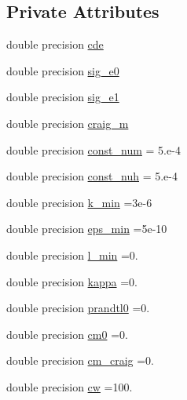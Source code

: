 \subsection*{Private Attributes}
\begin{DoxyCompactItemize}
\item 
double precision \mbox{\hyperlink{structmodulegotm_1_1t__gotmparameters_a56c279f79ac9971032ed2aae27a7fe9b}{cde}}
\item 
double precision \mbox{\hyperlink{structmodulegotm_1_1t__gotmparameters_a340e7be2fbc56cb11cd4e98757fda608}{sig\+\_\+e0}}
\item 
double precision \mbox{\hyperlink{structmodulegotm_1_1t__gotmparameters_a74ec12e25004762d70060b22a6632605}{sig\+\_\+e1}}
\item 
double precision \mbox{\hyperlink{structmodulegotm_1_1t__gotmparameters_a32b6b1902e46940038151e9fdd928470}{craig\+\_\+m}}
\item 
double precision \mbox{\hyperlink{structmodulegotm_1_1t__gotmparameters_a71a9e0eee6266fdc163da9e8ae44b205}{const\+\_\+num}} = 5.e-\/4
\item 
double precision \mbox{\hyperlink{structmodulegotm_1_1t__gotmparameters_a0475cc4d9f95443c3003a7100147d315}{const\+\_\+nuh}} = 5.e-\/4
\item 
double precision \mbox{\hyperlink{structmodulegotm_1_1t__gotmparameters_a5ddad8e5e492deae917dbce96609ddd8}{k\+\_\+min}} =3e-\/6
\item 
double precision \mbox{\hyperlink{structmodulegotm_1_1t__gotmparameters_a003f40f2dffc510ab45ee3267451e57a}{eps\+\_\+min}} =5e-\/10
\item 
double precision \mbox{\hyperlink{structmodulegotm_1_1t__gotmparameters_a31ed459d393617d68f5a573966113816}{l\+\_\+min}} =0.
\item 
double precision \mbox{\hyperlink{structmodulegotm_1_1t__gotmparameters_aed4aea5c8488cfd8b9e25ee3b0f2056b}{kappa}} =0.
\item 
double precision \mbox{\hyperlink{structmodulegotm_1_1t__gotmparameters_a831a0c37c8bdc3b3c395aa92d2a9d949}{prandtl0}} =0.
\item 
double precision \mbox{\hyperlink{structmodulegotm_1_1t__gotmparameters_a632be90dbc3ddf3daa25472d5861e46f}{cm0}} =0.
\item 
double precision \mbox{\hyperlink{structmodulegotm_1_1t__gotmparameters_a7fac7e114f64fd6ae0af65da9681f26e}{cm\+\_\+craig}} =0.
\item 
double precision \mbox{\hyperlink{structmodulegotm_1_1t__gotmparameters_ad29548a2775c0cc27a91ba0741d9159f}{cw}} =100.

\end{DoxyCompactItemize}
